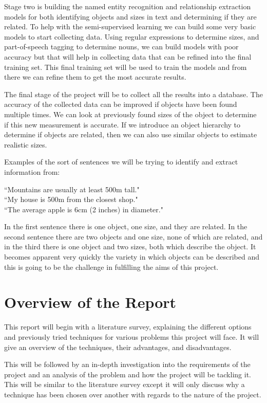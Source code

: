 \documentclass[11pt,oneside]{book}
\begin{document}
Stage two is building the named entity recognition and relationship extraction models for both identifying objects and sizes in text and determining if they are related. To help with the semi-supervised learning we can build some very basic models to start collecting data. Using regular expressions to determine sizes, and part-of-speech tagging to determine nouns, we can build models with poor accuracy but that will help in collecting data that can be refined into the final training set. This final training set will be used to train the models and from there we can refine them to get the most accurate results.

The final stage of the project will be to collect all the results into a database. The accuracy of the collected data can be improved if objects have been found multiple times. We can look at previously found sizes of the object to determine if this new measurement is accurate. If we introduce an object hierarchy to determine if objects are related, then we can also use similar objects to estimate realistic sizes.

Examples of the sort of sentences we will be trying to identify and extract information from:
\begin{displayquote}
“Mountains are usually at least 500m tall."
\\“My house is 500m from the closest shop."
\\“The average apple is 6cm (2 inches) in diameter."
\end{displayquote}

\noindent In the first sentence there is one object, one size, and they are related. In the second sentence there are two objects and one size, none of which are related, and in the third there is one object and two sizes, both which describe the object. It becomes apparent very quickly the variety in which objects can be described and this is going to be the challenge in fulfilling the aims of this project.

\section{Overview of the Report}

This report will begin with a literature survey, explaining the different options and previously tried techniques for various problems this project will face. It will give an overview of the techniques, their advantages, and disadvantages.

This will be followed by an in-depth investigation into the requirements of the project and an analysis of the problem and how the project will be tackling it. This will be similar to the literature survey except it will only discuss why a technique has been chosen over another with regards to the nature of the project.
\end{document}
